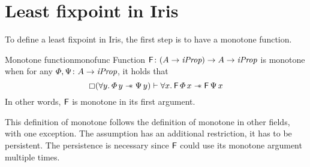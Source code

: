 \documentclass[thesis.tex]{subfiles}
\begin{document}
\section{Least fixpoint in Iris} \label{sec:fixIris}
To define a least fixpoint in Iris, the first step is to have a monotone function.
\begin{definition}{Monotone function}{monofunc}
  Function $\textsf{\upshape F}\colon (A \to \textit{iProp}) \to  A \to \textit{iProp}$ is monotone when for any $\varPhi, \Psi\colon A \to \textit{iProp}$, it holds that
  \[ \always(\All \varB. \pred\,\varB \wand \predB\,\varB) \proves \All \var. \hopred\,\pred\,\var \wand \hopred\,\predB\,\var\]
  In other words, $\textsf{\upshape F}$ is monotone in its first argument.
\end{definition}
This definition of monotone follows the definition of monotone in other fields, with one exception. The assumption has an additional restriction, it has to be persistent. The persistence is necessary since $\textsf{\upshape F}$ could use its monotone argument multiple times.
\end{document}
